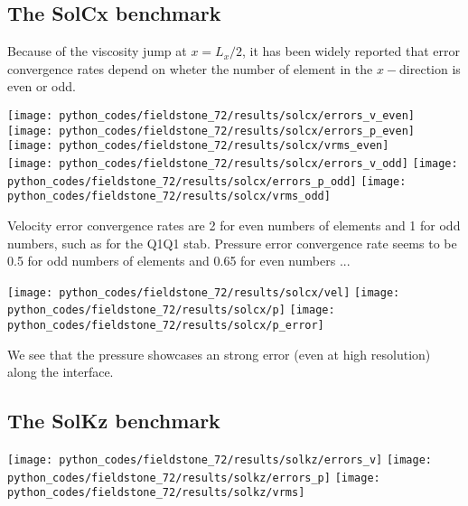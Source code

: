 \subsection*{The SolCx benchmark}

Because of the viscosity jump at $x=L_x/2$, it has been widely reported that 
error convergence rates depend on wheter the number of element in the $x-$direction 
is even or odd.

\begin{center}
\texttt{[image: python\_codes/fieldstone\_72/results/solcx/errors\_v\_even]}
\texttt{[image: python\_codes/fieldstone\_72/results/solcx/errors\_p\_even]}
\texttt{[image: python\_codes/fieldstone\_72/results/solcx/vrms\_even]}\\
\texttt{[image: python\_codes/fieldstone\_72/results/solcx/errors\_v\_odd]}
\texttt{[image: python\_codes/fieldstone\_72/results/solcx/errors\_p\_odd]}
\texttt{[image: python\_codes/fieldstone\_72/results/solcx/vrms\_odd]}
\end{center}

Velocity error convergence rates are 2 for even numbers of elements and 1 for odd numbers, 
such as for the Q1Q1 stab. 
Pressure error convergence rate seems to be 0.5 for odd numbers of elements and
0.65 for even numbers ... 

\begin{center}
\texttt{[image: python\_codes/fieldstone\_72/results/solcx/vel]}
\texttt{[image: python\_codes/fieldstone\_72/results/solcx/p]}
\texttt{[image: python\_codes/fieldstone\_72/results/solcx/p\_error]}
\end{center}

We see that the pressure showcases an strong error (even at high resolution)
along the interface. 


\subsection*{The SolKz benchmark}

\begin{center}
\texttt{[image: python\_codes/fieldstone\_72/results/solkz/errors\_v]}
\texttt{[image: python\_codes/fieldstone\_72/results/solkz/errors\_p]}
\texttt{[image: python\_codes/fieldstone\_72/results/solkz/vrms]}
\end{center}

